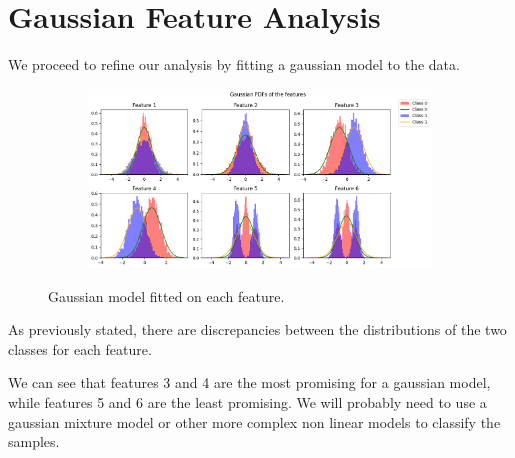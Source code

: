 \documentclass[12pt]{report}
\newcommand{\nl}{%
    \newline
    \noindent
}
\begin{document}
\section{Gaussian Feature Analysis}
\label{sec:gauss_analysis}
We proceed to refine our analysis by fitting a gaussian model to the data.
\begin{figure}[H]
    \centering
    \begin{subfigure}[t]{1\textwidth}
        \includegraphics[width=\textwidth]{./plot/gauss_analysis/gaussian_analysis.png}
    \end{subfigure}
    \caption{Gaussian model fitted on each feature.}
    \label{fig:gauss_analysis}
\end{figure}
\noindent
As previously stated, there are discrepancies between the distributions of the two classes for each feature.
\nl
We can see that features 3 and 4 are the most promising for a gaussian model, while features 5 and 6 are the least promising. We will probably need to use a gaussian mixture model or other more complex non linear models to classify the samples.
\end{document}
